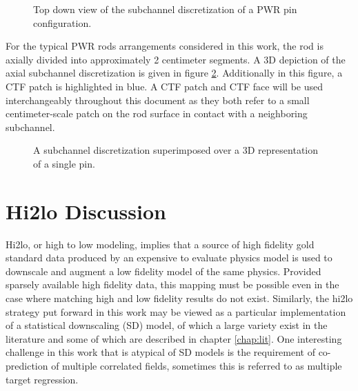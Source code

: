 \begin{figure}[H]
	\centering
	
	\caption{Top down view of the subchannel discretization of a PWR pin configuration.}
	\label{fig:ctf_subchannel}
\end{figure}

For the typical PWR rods arrangements considered in this work, the rod is axially divided into approximately 2 centimeter segments.  A 3D depiction of the axial subchannel discretization is given in figure \ref{fig:ctf_axial_dis}.  Additionally in this figure, a CTF patch is highlighted in blue.  A CTF patch and CTF face will be used interchangeably throughout this document as they both refer to a small centimeter-scale patch on the rod surface in contact with a neighboring subchannel.

\begin{figure}[H]
	\centering
	
	\caption{A subchannel discretization superimposed over a 3D representation of a single pin.}
	\label{fig:ctf_axial_dis}
\end{figure}


\section{Hi2lo Discussion}

Hi2lo, or high to low modeling, implies that a source of high fidelity gold standard data produced by an expensive to evaluate physics model is used to downscale and augment a low fidelity model of the same physics.
Provided sparsely available high fidelity data, this mapping must be possible even in the case where matching high and low fidelity results do not exist.  Similarly, the hi2lo strategy put forward in this work may be viewed as a particular implementation of a statistical downscaling (SD) model, of which a large variety exist in the literature and some of which are described in chapter \ref{chap:lit}.  One interesting challenge in this work that is atypical of SD models is the requirement of co-prediction of multiple correlated fields, sometimes this is referred to as multiple target regression.


